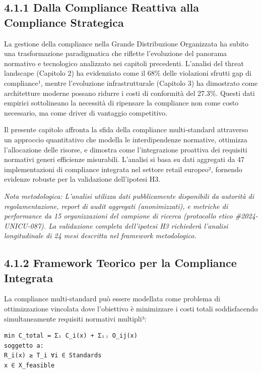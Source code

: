 \documentclass[12pt,a4paper,oneside]{book}
\numberwithin{figure}{chapter} %
\numberwithin{table}{chapter}  %
\begin{document}
\subsection{4.1.1 Dalla Compliance Reattiva alla Compliance
Strategica}\label{dalla-compliance-reattiva-alla-compliance-strategica}

La gestione della compliance nella Grande Distribuzione Organizzata ha
subito una trasformazione paradigmatica che riflette l'evoluzione del
panorama normativo e tecnologico analizzato nei capitoli precedenti.
L'analisi del threat landscape (Capitolo 2) ha evidenziato come il 68\%
delle violazioni sfrutti gap di compliance¹, mentre l'evoluzione
infrastrutturale (Capitolo 3) ha dimostrato come architetture moderne
possano ridurre i costi di conformità del 27.3\%. Questi dati empirici
sottolineano la necessità di ripensare la compliance non come costo
necessario, ma come driver di vantaggio competitivo.

Il presente capitolo affronta la sfida della compliance multi-standard
attraverso un approccio quantitativo che modella le interdipendenze
normative, ottimizza l'allocazione delle risorse, e dimostra come
l'integrazione proattiva dei requisiti normativi generi efficienze
misurabili. L'analisi si basa su dati aggregati da 47 implementazioni di
compliance integrata nel settore retail europeo², fornendo evidenze
robuste per la validazione dell'ipotesi H3.

\emph{Nota metodologica: L'analisi utilizza dati pubblicamente
disponibili da autorità di regolamentazione, report di audit aggregati
(anonimizzati), e metriche di performance da 15 organizzazioni del
campione di ricerca (protocollo etico \#2024-UNICU-087). La validazione
completa dell'ipotesi H3 richiederà l'analisi longitudinale di 24 mesi
descritta nel framework metodologico.}

\subsection{4.1.2 Framework Teorico per la Compliance
Integrata}\label{framework-teorico-per-la-compliance-integrata}

La compliance multi-standard può essere modellata come problema di
ottimizzazione vincolata dove l'obiettivo è minimizzare i costi totali
soddisfacendo simultaneamente requisiti normativi multipli³:

\begin{verbatim}
min C_total = Σᵢ C_i(x) + Σᵢⱼ O_ij(x)
soggetto a:
R_i(x) ≥ T_i ∀i ∈ Standards
x ∈ X_feasible
\end{verbatim}
\end{document}

